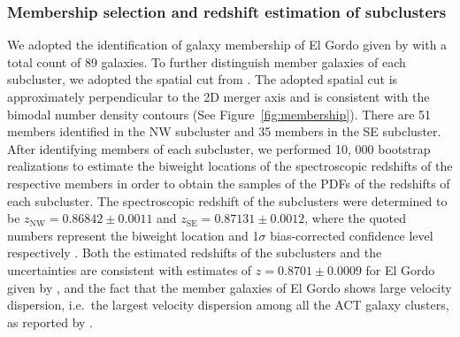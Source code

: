 \documentclass[letterpaper,useAMS,usenatbib]{mn2e}
\begin{document}
\subsubsection{Membership selection and redshift estimation of subclusters}
We adopted the identification of galaxy membership of El Gordo given by
\citet{Sifon13} with a total count of 89 galaxies.
To further distinguish member galaxies of each subcluster, we adopted the
spatial cut from .
The adopted spatial cut is approximately perpendicular to the 2D merger
axis  and is consistent with
the bimodal number density contours (See Figure~\ref{fig:membership}). 
There are 51 members identified in the NW subcluster and 35 members in the SE
subcluster. 
After identifying members of each subcluster, we performed 10, 000 bootstrap realizations to estimate the biweight
locations of the spectroscopic redshifts of the respective members in order
to obtain the samples of the PDFs of the redshifts of each subcluster. 
The spectroscopic redshift of the subclusters were
determined to be 
$z_{\mathrm{NW}} = 0.86842 \pm 0.0011$ and 
$z_{\mathrm{SE}} = 0.87131 \pm 0.0012$, where the quoted numbers represent the
biweight location and 1$\sigma$ bias-corrected confidence level
respectively \citep{Beers90}.  
Both the estimated redshifts of the subclusters and the uncertainties are
consistent with estimates of $z=0.8701 \pm 0.0009$ for El Gordo given by \citealt{Sifon13}, and the fact that the
member galaxies of El
Gordo shows large velocity dispersion, i.e.\ the largest velocity
dispersion among all the ACT galaxy clusters, as reported by
.
\end{document}

